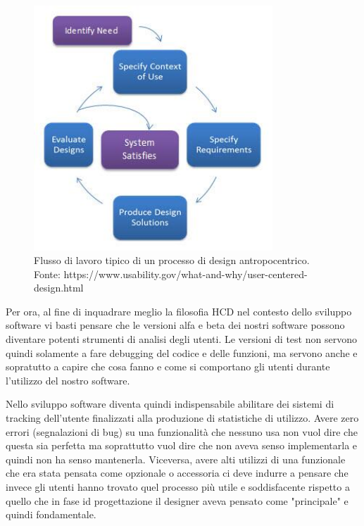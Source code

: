 \begin{figure}[!h]
	\centering
	\includegraphics[width=0.8\textwidth]{../immagini/HCD-chart}
	\caption{Flusso di lavoro tipico di un processo di design antropocentrico. Fonte: https://www.usability.gov/what-and-why/user-centered-design.html}
	\label{hcd-chart}
\end{figure}

Per ora, al fine di inquadrare meglio la filosofia HCD nel contesto dello sviluppo software vi basti pensare che le versioni alfa e beta dei nostri software possono diventare potenti strumenti di analisi degli utenti. Le versioni di test non servono quindi solamente a fare debugging del codice e delle funzioni, ma servono anche e sopratutto a capire che cosa fanno e come si comportano gli utenti durante l'utilizzo del nostro software.

Nello sviluppo software diventa quindi indispensabile abilitare dei sistemi di tracking dell'utente finalizzati alla produzione di statistiche di utilizzo. Avere zero errori (segnalazioni di bug) su una funzionalità che nessuno usa non vuol dire che questa sia perfetta ma soprattutto vuol dire che non aveva senso implementarla e quindi non ha senso mantenerla. Viceversa, avere alti utilizzi di una funzionale che era stata pensata come opzionale o accessoria ci deve indurre a pensare che invece gli utenti hanno trovato quel processo più utile e soddisfacente rispetto a quello che in fase id progettazione il designer aveva pensato come "principale" e quindi fondamentale.



